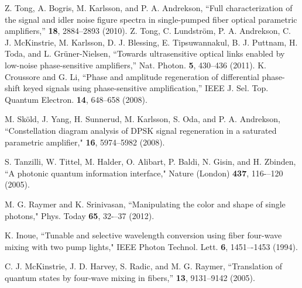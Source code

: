 \documentclass[10pt,letterpaper]{article}
\begin{document}
\begin{thebibliography}{99}


%
%
%
%

 Z. Tong, A. Bogris, M. Karlsson, and P. A. Andrekson, ``Full characterization of the signal and idler noise figure spectra in single-pumped fiber optical parametric amplifiers,'' \opex \textbf{18}, 2884--2893 (2010). 
%
 Z. Tong, C. Lundstr\"{o}m, P. A. Andrekson, C. J. McKinstrie, M. Karlsson, D. J. Blessing, E. Tipsuwannakul, B. J. Puttnam, H. Toda, and L. Gr\"{u}ner-Nielsen, ``Towards ultrasensitive optical links enabled by low-noise phase-sensitive amplifiers,'' Nat. Photon. \textbf{5}, 430--436 (2011).
%
 K. Croussore and G. Li, ``Phase and amplitude regeneration of differential phase-shift keyed signals using phase-sensitive amplification,''  IEEE J. Sel. Top. Quantum Electron. \textbf{14}, 648--658 (2008).

 M. Sk\"{o}ld, J. Yang, H. Sunnerud, M. Karlsson, S. Oda, and P. A. Andrekson, ``Constellation diagram analysis of DPSK signal regeneration in a saturated parametric amplifier," \opex \textbf{16}, 5974--5982 (2008).

 S. Tanzilli, W. Tittel, M. Halder, O. Alibart, P. Baldi, N. Gisin, and H. Zbinden, ``A photonic quantum information interface," Nature (London) \textbf{437}, 116-–120 (2005).

 M. G. Raymer and K. Srinivasan, ``Manipulating the color and shape of single photons," Phys. Today \textbf{65}, 32-–37 (2012).

 K. Inoue, ``Tunable and selective wavelength conversion using fiber four-wave mixing with two pump lights," IEEE Photon Technol. Lett. \textbf{6}, 1451–-1453 (1994).

 C. J. McKinstrie, J. D. Harvey, S. Radic, and M. G. Raymer, ``Translation of quantum states by four-wave mixing in fibers,'' \opex \textbf{13}, 9131--9142 (2005).


\end{thebibliography}
\end{document}
